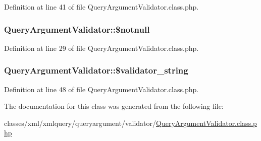 Definition at line 41 of file Query\+Argument\+Validator.\+class.\+php.

\hypertarget{classQueryArgumentValidator_a45e9ab83bacc4f0895f05faa3aeac81c}{
\subsubsection[{\$notnull}]{\setlength{\rightskip}{0pt plus 5cm}Query\+Argument\+Validator\+::\$notnull}}\label{classQueryArgumentValidator_a45e9ab83bacc4f0895f05faa3aeac81c}


Definition at line 29 of file Query\+Argument\+Validator.\+class.\+php.

\hypertarget{classQueryArgumentValidator_aa06a359be9617e979f903ae78537ad79}{
\subsubsection[{\$validator\+\_\+string}]{\setlength{\rightskip}{0pt plus 5cm}Query\+Argument\+Validator\+::\$validator\+\_\+string}}\label{classQueryArgumentValidator_aa06a359be9617e979f903ae78537ad79}


Definition at line 48 of file Query\+Argument\+Validator.\+class.\+php.



The documentation for this class was generated from the following file\+:\begin{DoxyCompactItemize}
\item 
classes/xml/xmlquery/queryargument/validator/\hyperlink{QueryArgumentValidator_8class_8php}{Query\+Argument\+Validator.\+class.\+php}\end{DoxyCompactItemize}
